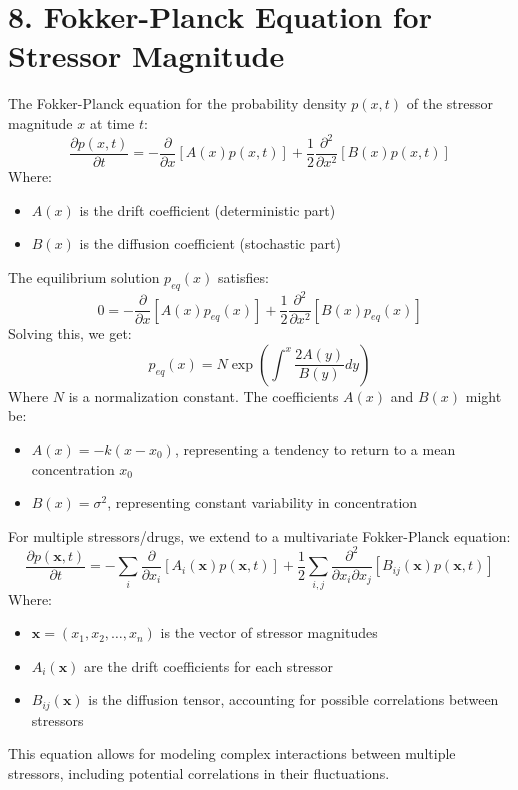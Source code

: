 \documentclass{article}
\begin{document}
\section*{8. Fokker-Planck Equation for Stressor Magnitude}
The Fokker-Planck equation for the probability density $p(x,t)$ of the stressor magnitude $x$ at time $t$:
\begin{equation}
\frac{\partial p(x,t)}{\partial t} = -\frac{\partial}{\partial x}[A(x)p(x,t)] + \frac{1}{2}\frac{\partial^2}{\partial x^2}[B(x)p(x,t)]
\end{equation}
Where:
\begin{itemize}
\item $A(x)$ is the drift coefficient (deterministic part)
\item $B(x)$ is the diffusion coefficient (stochastic part)
\end{itemize}
The equilibrium solution $p_{eq}(x)$ satisfies:
\begin{equation}
0 = -\frac{\partial}{\partial x}[A(x)p_{eq}(x)] + \frac{1}{2}\frac{\partial^2}{\partial x^2}[B(x)p_{eq}(x)]
\end{equation}
Solving this, we get:
\begin{equation}
p_{eq}(x) = N \exp\left(\int^x \frac{2A(y)}{B(y)} dy\right)
\end{equation}
Where $N$ is a normalization constant.
The coefficients $A(x)$ and $B(x)$ might be:
\begin{itemize}
\item $A(x) = -k(x-x_0)$, representing a tendency to return to a mean concentration $x_0$
\item $B(x) = \sigma^2$, representing constant variability in concentration
\end{itemize}
For multiple stressors/drugs, we extend to a multivariate Fokker-Planck equation:
\begin{equation}
\frac{\partial p(\mathbf{x},t)}{\partial t} = -\sum_i \frac{\partial}{\partial x_i}[A_i(\mathbf{x})p(\mathbf{x},t)] + \frac{1}{2}\sum_{i,j} \frac{\partial^2}{\partial x_i \partial x_j}[B_{ij}(\mathbf{x})p(\mathbf{x},t)]
\end{equation}
Where:
\begin{itemize}
\item $\mathbf{x} = (x_1, x_2, \ldots, x_n)$ is the vector of stressor magnitudes
\item $A_i(\mathbf{x})$ are the drift coefficients for each stressor
\item $B_{ij}(\mathbf{x})$ is the diffusion tensor, accounting for possible correlations between stressors
\end{itemize}
This equation allows for modeling complex interactions between multiple stressors, including potential correlations in their fluctuations.
\end{document}
